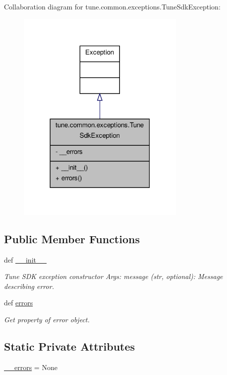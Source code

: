 Collaboration diagram for tune.\-common.\-exceptions.\-Tune\-Sdk\-Exception\-:
\nopagebreak
\begin{figure}[H]
\begin{center}
\leavevmode
\includegraphics[width=230pt]{classtune_1_1common_1_1exceptions_1_1TuneSdkException__coll__graph}
\end{center}
\end{figure}
\subsection*{Public Member Functions}
\begin{DoxyCompactItemize}
\item 
def \hyperlink{classtune_1_1common_1_1exceptions_1_1TuneSdkException_a73d360d1867d5e024f7382d32a6b8fff}{\-\_\-\-\_\-init\-\_\-\-\_\-}
\begin{DoxyCompactList}\small\item\em Tune S\-D\-K exception constructor Args\-: message (str, optional)\-: Message describing error. \end{DoxyCompactList}\item 
def \hyperlink{classtune_1_1common_1_1exceptions_1_1TuneSdkException_ab729754c9031f531e7d6eed2389733fd}{errors}
\begin{DoxyCompactList}\small\item\em Get property of error object. \end{DoxyCompactList}\end{DoxyCompactItemize}
\subsection*{Static Private Attributes}
\begin{DoxyCompactItemize}
\item 
\hyperlink{classtune_1_1common_1_1exceptions_1_1TuneSdkException_a17770d669ae88aeb8aab99d01bf900c8}{\-\_\-\-\_\-errors} = None
\end{DoxyCompactItemize}


